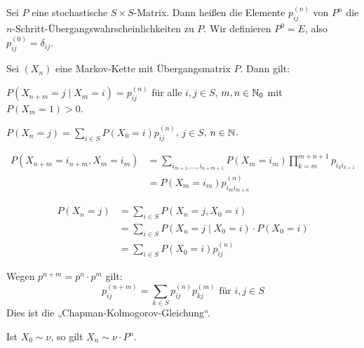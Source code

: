 \documentclass[a4paper,twoside,DIV15,BCOR12mm]{scrbook}
\begin{document}
\begin{definition}
Sei $P$ eine stochastische $S\times S$-Matrix. Dann heißen die Elemente $p_{ij}^{(n)}$ von $P^n$ die $n$-Schritt-Übergangswahrscheinlichkeiten zu $P$. Wir definieren $P^0=E$, also $p^{(0)}_{ij}= \delta_{ij}$.
\end{definition}

\begin{satz}
Sei $(X_n)$ eine Markov-Kette mit Übergangsmatrix $P$. Dann gilt:
\begin{enuma}
\item $P(X_{n+m} = j\mid X_m = i) = p_{ij}^{(n)}$ für alle $i,j\in S$, $m,n\in\mathbb{N}_0$ mit $P(X_m=1)>0$.
\item $P(X_n = j) = \sum_{i\in S} P(X_0=i)p_{ij}^{(n)}$, $j\in S$, $n\in\mathbb{N}$.
\end{enuma}
\end{satz}

\begin{beweis}
\begin{enuma}
\item 
\begin{align*}
P(X_{n+m} =i_{n+m} , X_m=i_m) &= \sum_{i_{m+1},\ldots,i_{n+m+1}} P(X_m = i_m) \prod_{k=m}^{m+n+1} p_{i_ki_{k+1}} \\
&= P(X_m = i_m) p_{i_mi_{m+n}}^{(n)}
\end{align*}
\item 
\begin{align*}
P(X_n=j) &= \sum_{i\in S} P(X_n=j, X_0=i) \\
&= \sum_{i\in S} P(X_n = j \mid X_0 = i)\cdot P(X_0 = i) \\
&= \sum_{i\in S} P(X_0 = i) p_{ij}^{(n)}
\end{align*}
\end{enuma}
\end{beweis}

\begin{bemerkung}
\begin{enumi}
\item Wegen $p^{n+m}  = p^n \cdot p^m$ gilt: 
\[
p_{ij}^{(n+m)}  = \sum_{k\in S} p_{ij}^{(n)}p_{kj}^{(m)} \text{ für } i,j\in S
\]
Dies ist die „Chapman-Kolmogorov-Gleichung“.
\item Ist $X_0 \sim \nu$, so gilt $X_n \sim \nu\cdot P^n$.
\end{enumi}
\end{bemerkung}
\end{document}
